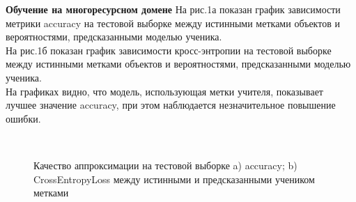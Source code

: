 \newpage
\textbf{Обучение на многоресурсном домене}
На рис.1а показан график зависимости метрики accuracy на тестовой выборке между истинными метками объектов и вероятностями, предсказанными моделью ученика.\\
На рис.1б показан график зависимости кросс-энтропии на тестовой выборке между истинными метками объектов и вероятностями, предсказанными моделью ученика.\\
На графиках видно, что модель, использующая метки учителя, показывает лучшее значение accuracy, при этом наблюдается незначительное повышение ошибки.
\begin{figure}[h!t]\center
{}
\\
\caption{Качество аппроксимации на тестовой выборке a) accuracy; b) CrossEntropyLoss между истинными и предсказанными учеником метками}
\end{figure}

